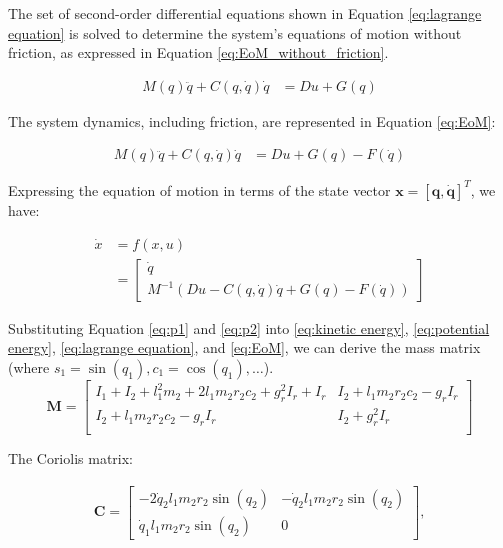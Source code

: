     The set of second-order differential equations shown in Equation \ref{eq:lagrange equation} is solved to determine the system's equations of motion without friction, as expressed in Equation \ref{eq:EoM_without_friction}.
    
    \begin{align}
        \label{eq:EoM_without_friction}
        M(q)\ddot{q} + C(q,\dot{q})\dot{q} &= Du + G(q)
   \end{align}
   
    The system dynamics, including friction, are represented in Equation \ref{eq:EoM}:
   
   \begin{align}
        \label{eq:EoM}
        M(q)\ddot{q} + C(q,\dot{q})\dot{q} &= Du + G(q) - F(\dot{q})
   \end{align}
    
    Expressing the equation of motion in terms of the state vector \(\mathbf{x}=[\mathbf{q},\mathbf{\dot{q}}]^T\), we have:
    
    \begin{equation}
    \begin{split}
        \dot{x} &= f(x,u) \\
        &= \begin{bmatrix} 
            \dot{q} \\ 
            M^{-1}(Du - C(q,\dot{q})\dot{q} + G(q) - F(\dot{q})) 
       \end{bmatrix}
    \end{split}
    \end{equation}

    Substituting Equation \ref{eq:p1} and \ref{eq:p2} into \ref{eq:kinetic energy}, \ref{eq:potential energy}, \ref{eq:lagrange equation}, and \ref{eq:EoM}, we can derive the mass matrix (where \(s_1 = \sin(q_1), c_1 = \cos(q_1), \ldots\)).
    \begin{equation}
    \mathbf{M} =
    \left[ 
    {\begin{array}{cc}
    I_1 + I_2 + l_1^2m_2 + 2l_1m_2r_2c_2 + g_r^2I_r + I_r  &   I_2 + l_1m_2r_2c_2 - g_rI_r  \\
    I_2 + l_1m_2r_2c_2 - g_rI_r                    & I_2 + g_r^2I_r                       \\
    \end{array}} 
    \right]
    \end{equation}
    
    The Coriolis matrix:
    
    \begin{equation}
    \begin{split}
    \mathbf{C} = \left[
    \begin{matrix}
    -2 \dot{q}_2 l_{1} m_{2} r_{2} \sin(q_2) & -\dot{q}_2 l_{1} m_{2} r_{2} \sin(q_2)\\
    \dot{q}_1 l_{1} m_{2} r_{2} \sin(q_2) & 0
    \end{matrix}
    \right],
    \label{eq:coriolis_matrix}
    \end{split}
    \end{equation}
    
